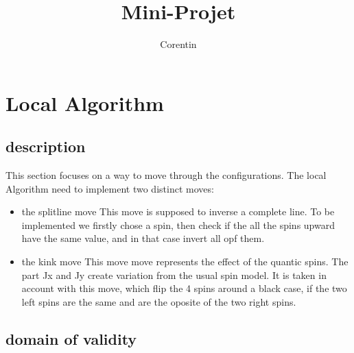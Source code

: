 \documentclass[a4paper,12pt,twoside]{article}
\title{Mini-Projet}
\author{Corentin \bsc{Bisot}}
\begin{document}
	
	\section{Local Algorithm}
	\subsection{description}
		
		 This section focuses on a way to move through the configurations.
		 The local Algorithm need to implement two distinct moves:
		 
		 \begin{itemize}
		 	\item{the splitline move} This move is supposed to inverse a complete line. To be implemented we firstly chose a spin, then check if the all the spins upward have the same value, and in that case invert all opf them.
		 	
		 	\item{the kink move} This move move represents the effect of the quantic spins. The part Jx and Jy create variation from the usual spin model. It is taken in account with this move, which flip the 4 spins around a black case, if the two left spins are the same and are the oposite of the two right spins.
		 \end{itemize}
		 	
		 	
		 	
		 	\subsection{domain of validity}
\end{document}
